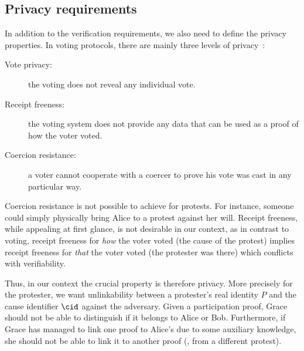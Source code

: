 \subsection{Privacy requirements}%
\label{privacy-properties}

In addition to the verification requirements, we also need to define the privacy properties.
In voting protocols, there are mainly three levels of privacy~\cite{VerifyingPrivacyPropertiesOfVotingProtocols}:
\begin{description}
  \item[Vote privacy:] the voting does not reveal any individual vote.
  \item[Receipt freeness:] the voting system does not provide any data that can 
    be used as a proof of how the voter voted.
  \item[Coercion resistance:] a voter cannot cooperate with a coercer to prove 
    his vote was cast in any particular way.
\end{description}

Coercion resistance is not possible to achieve for protests.
For instance, someone could simply physically bring Alice to a protest against her will.
Receipt freeness, while appealing at first glance, is not desirable in our context, as in contrast to voting, receipt freeness for \emph{how} the voter voted (\ie the cause of the protest) implies receipt freeness for \emph{that} the voter voted (\ie the protester was there) which conflicts with verifiability.  

Thus, in our context the crucial property is therefore privacy.
More precisely for the protester, we want unlinkability between a protester's real identity \(P\) and the cause identifier \(\cid\) against the adversary.
Given a participation proof, Grace should not be able to distinguish if it belongs to Alice or Bob.
Furthermore, if Grace has managed to link one proof to Alice's due to some auxiliary knowledge, she should not be able to link it to another proof (\eg, from a different protest).



